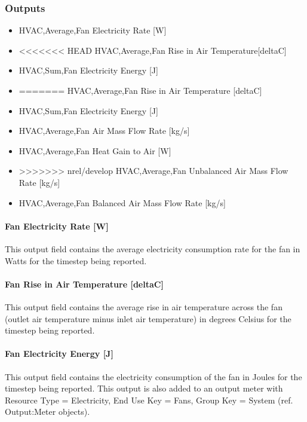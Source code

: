 \subsubsection{Outputs}\label{outputs-3-007}

\begin{itemize}
\item
  HVAC,Average,Fan Electricity Rate {[}W{]}
\item
<<<<<<< HEAD
  HVAC,Average,Fan Rise in Air Temperature{[}deltaC{]}
\item
  HVAC,Sum,Fan Electricity Energy {[}J{]}
\item
=======
  HVAC,Average,Fan Rise in Air Temperature {[}deltaC{]}
\item
  HVAC,Sum,Fan Electricity Energy {[}J{]}
\item
  HVAC,Average,Fan Air Mass Flow Rate {[}kg/s{]}
\item
  HVAC,Average,Fan Heat Gain to Air {[}W{]}
\item
>>>>>>> nrel/develop
  HVAC,Average,Fan Unbalanced Air Mass Flow Rate {[}kg/s{]}
\item
  HVAC,Average,Fan Balanced Air Mass Flow Rate {[}kg/s{]}
\end{itemize}

\paragraph{Fan Electricity Rate {[}W{]}}\label{fan-electric-power-w-3}

This output field contains the average electricity consumption rate for the fan in Watts for the timestep being reported.

\paragraph{Fan Rise in Air Temperature {[}deltaC{]}}\label{fan-rise-in-air-temperature-deltac-3}

This output field contains the average rise in air temperature across the fan (outlet air temperature minus inlet air temperature) in degrees Celsius for the timestep being reported.

\paragraph{Fan Electricity Energy {[}J{]}}\label{fan-electric-energy-j-3}

This output field contains the electricity consumption of the fan in Joules for the timestep being reported. This output is also added to an output meter with Resource Type = Electricity, End Use Key = Fans, Group Key = System (ref. Output:Meter objects).

